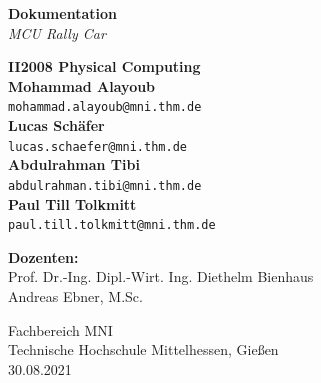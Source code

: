 \begin{titlepage}
	\begin{center}
		\begin{figure}
			\hfill
		\end{figure}
		\vspace*{0.5cm}
		\Huge
		\textbf{Dokumentation}\\
		
		\Huge	
		\vspace*{1.25cm}
		\textit{MCU Rally Car}\\
		\vspace*{1.25cm}		
		
		\Large
		\textbf{II2008 Physical Computing}\\
		
		\vfill 
		\large
		\textbf{Mohammad Alayoub}\\
		\texttt{mohammad.alayoub@mni.thm.de}\vspace*{0.5cm}\\
		\textbf{Lucas Schäfer}\\
		\texttt{lucas.schaefer@mni.thm.de}\vspace*{0.5cm}\\
		\textbf{Abdulrahman Tibi}\\
		\texttt{abdulrahman.tibi@mni.thm.de}\vspace*{0.5cm}\\
		\textbf{Paul Till Tolkmitt}\\
		\texttt{paul.till.tolkmitt@mni.thm.de}\vspace*{0.5cm}\\
		
		\vfill
		
		\textbf{Dozenten:}\\   
		Prof. Dr.-Ing. Dipl.-Wirt. Ing. Diethelm Bienhaus\\
		Andreas Ebner, M.Sc.\\
		
		\vfill
		
		\large
		Fachbereich MNI\\
		Technische Hochschule Mittelhessen, Gießen\\
		30.08.2021 %
		
	\end{center}
\end{titlepage}
